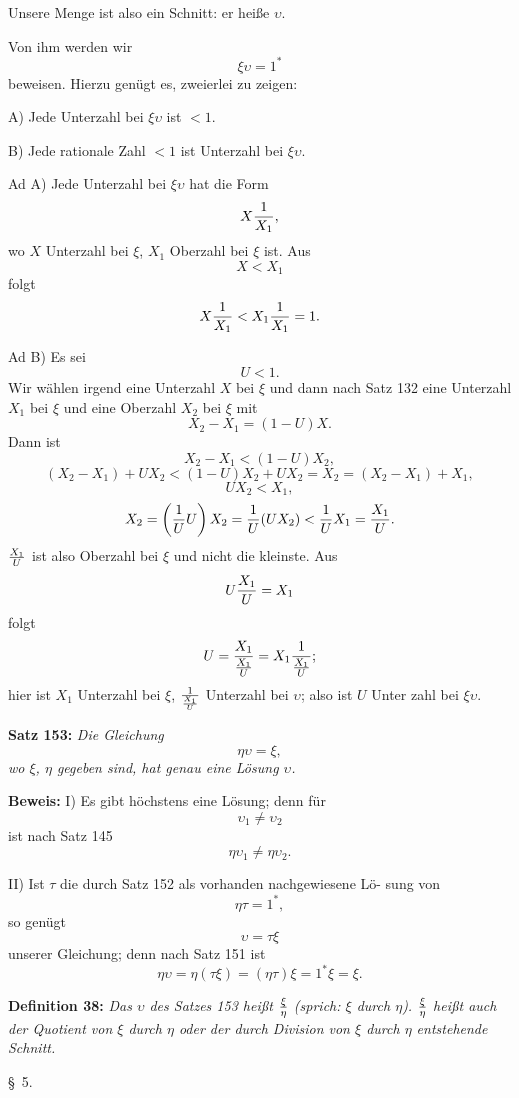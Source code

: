Unsere Menge ist also ein Schnitt: er hei{\ss}e $\upsilon$.

Von ihm werden wir
$$\xi\upsilon = 1^*$$
beweisen.  Hierzu gen\"ugt es, zweierlei zu zeigen:

A) Jede Unterzahl bei $\xi\upsilon$ ist $< 1$.

B) Jede rationale Zahl $< 1$ ist Unterzahl bei $\xi\upsilon$.

Ad A) Jede Unterzahl bei $\xi\upsilon$ hat die Form
$$X{1 \over X_1},$$
wo $X$ Unterzahl bei $\xi$, $X_1$ Oberzahl bei $\xi$ ist.  Aus
$$X < X_1$$
folgt
$$X{1 \over X_1} < X_1{1 \over X_1} = 1.$$

Ad B) Es sei
$$U < 1.$$
Wir w\"ahlen irgend eine Unterzahl $X$ bei $\xi$ und dann nach Satz
132 eine Unterzahl $X_1$ bei $\xi$ und eine Oberzahl $X_2$ bei $\xi$ mit
$$X_2 - X_1 = (1 - U)X.$$
Dann ist
$$X_2 - X_1 < (1 - U)X_2,$$
$$(X_2 - X_1) + U X_2 < (1 - U)X_2 + U X_2 = X_2 = (X_2 - X_1) + X_1,$$
$$U X_2 < X_1,$$
$$X_2 = \left({1 \over U} U\right)X_2 = {1 \over U}(U X_2) < {1 \over U}X_1 = {X_1 \over U}.$$
$X_1 \over U$ ist also Oberzahl bei $\xi$ und nicht die kleinste.  Aus
$$U{X_1 \over U} = X_1$$
folgt
$$U = {X_1 \over {X_1 \over U}} = X_1{1 \over {X_1 \over U}};$$
hier ist $X_1$ Unterzahl bei $\xi$, $1 \over {X_1 \over U}$ Unterzahl bei $\upsilon$; also ist $U$ Unter%
zahl bei $\xi\upsilon$.
\medskip


{\bf Satz 153:} {\it Die Gleichung
$$\eta\upsilon = \xi,$$
wo $\xi$, $\eta$ gegeben sind, hat genau eine L\"osung $\upsilon$.}

{\bf Beweis:} I) Es gibt h\"ochstens eine L\"osung; denn f\"ur
$$\upsilon_1 \ne \upsilon_2$$
ist nach Satz 145
$$\eta\upsilon_1 \ne \eta\upsilon_2.$$

II) Ist $\tau$ die durch Satz 152 als vorhanden nachgewiesene L\"o-
sung von
$$\eta\tau = 1^*,$$
so gen\"ugt
$$\upsilon = \tau\xi$$
unserer Gleichung; denn nach Satz 151 ist
$$\eta\upsilon = \eta(\tau\xi) = (\eta\tau)\xi = 1^* \xi = \xi.$$
\medskip

{\bf Definition 38:} {\it Das $\upsilon$ des Satzes 153 hei{\ss}t $\xi \over \eta$ {\rm (sprich: $\xi$ durch
$\eta$).}  $\xi \over \eta$ hei{\ss}t auch der Quotient von $\xi$ durch $\eta$ oder der durch Division
von $\xi$ durch $\eta$ entstehende Schnitt.}
\vfill\eject



\line{}\baselineskip
\centerline{{\S}~5.}
\medskip

